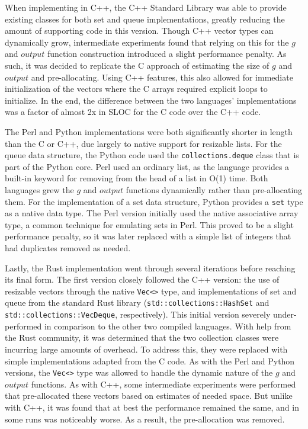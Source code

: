 When implementing in C++, the C++ Standard Library was able to provide existing classes for both set and queue implementations, greatly reducing the amount of supporting code in this version. Though C++ vector types can dynamically grow, intermediate experiments found that relying on this for the $g$ and $output$ function construction introduced a slight performance penalty. As such, it was decided to replicate the C approach of estimating the size of $g$ and $output$ and pre-allocating. Using C++ features, this also allowed for immediate initialization of the vectors where the C arrays required explicit loops to initialize. In the end, the difference between the two languages' implementations was a factor of almost 2x in SLOC for the C code over the C++ code.

The Perl and Python implementations were both significantly shorter in length than the C or C++, due largely to native support for resizable lists. For the queue data structure, the Python code used the \texttt{collections.deque} class that is part of the Python core. Perl used an ordinary list, as the language provides a built-in keyword for removing from the head of a list in O(1) time. Both languages grew the $g$ and $output$ functions dynamically rather than pre-allocating them. For the implementation of a set data structure, Python provides a \texttt{set} type as a native data type. The Perl version initially used the native associative array type, a common technique for emulating sets in Perl. This proved to be a slight performance penalty, so it was later replaced with a simple list of integers that had duplicates removed as needed.

Lastly, the Rust implementation went through several iterations before reaching its final form. The first version closely followed the C++ version: the use of resizable vectors through the native \texttt{Vec<>} type, and implementations of set and queue from the standard Rust library (\texttt{std::collections::HashSet} and \texttt{std::collections::VecDeque}, respectively). This initial version severely under-performed in comparison to the other two compiled languages. With help from the Rust community, it was determined that the two collection classes were incurring large amounts of overhead. To address this, they were replaced with simple implementations adapted from the C code. As with the Perl and Python versions, the \texttt{Vec<>} type was allowed to handle the dynamic nature of the $g$ and $output$ functions. As with C++, some intermediate experiments were performed that pre-allocated these vectors based on estimates of needed space. But unlike with C++, it was found that at best the performance remained the same, and in some runs was noticeably worse. As a result, the pre-allocation was removed.

